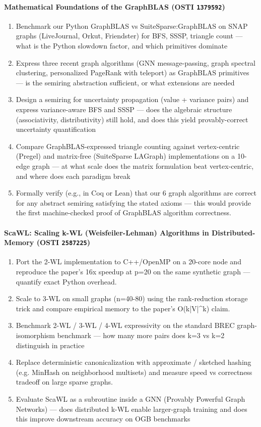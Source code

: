 \documentclass[11pt]{article}
\begin{document}
\paragraph{Mathematical Foundations of the GraphBLAS \textnormal{\small(OSTI \texttt{1379592})}}
\begin{enumerate}[leftmargin=1.6em,itemsep=0.2em,topsep=0.2em,label=Q\arabic*.]
\item Benchmark our Python GraphBLAS vs SuiteSparse:GraphBLAS on SNAP graphs (LiveJournal, Orkut, Friendster) for BFS, SSSP, triangle count --- what is the Python slowdown factor, and which primitives dominate
\item Express three recent graph algorithms (GNN message-passing, graph spectral clustering, personalized PageRank with teleport) as GraphBLAS primitives --- is the semiring abstraction sufficient, or what extensions are needed
\item Design a semiring for uncertainty propagation (value + variance pairs) and express variance-aware BFS and SSSP --- does the algebraic structure (associativity, distributivity) still hold, and does this yield provably-correct uncertainty quantification
\item Compare GraphBLAS-expressed triangle counting against vertex-centric (Pregel) and matrix-free (SuiteSparse LAGraph) implementations on a 10-edge graph --- at what scale does the matrix formulation beat vertex-centric, and where does each paradigm break
\item Formally verify (e.g., in Coq or Lean) that our 6 graph algorithms are correct for any abstract semiring satisfying the stated axioms --- this would provide the first machine-checked proof of GraphBLAS algorithm correctness.
\end{enumerate}
\paragraph{ScaWL: Scaling k-WL (Weisfeiler-Lehman) Algorithms in Distributed-Memory \textnormal{\small(OSTI \texttt{2587225})}}
\begin{enumerate}[leftmargin=1.6em,itemsep=0.2em,topsep=0.2em,label=Q\arabic*.]
\item Port the 2-WL implementation to C++/OpenMP on a 20-core node and reproduce the paper's 16x speedup at p=20 on the same synthetic graph --- quantify exact Python overhead.
\item Scale to 3-WL on small graphs (n=40-80) using the rank-reduction storage trick and compare empirical memory to the paper's O(k|V|\textasciicircum{}k) claim.
\item Benchmark 2-WL / 3-WL / 4-WL expressivity on the standard BREC graph-isomorphism benchmark --- how many more pairs does k=3 vs k=2 distinguish in practice
\item Replace deterministic canonicalization with approximate / sketched hashing (e.g. MinHash on neighborhood multisets) and measure speed vs correctness tradeoff on large sparse graphs.
\item Evaluate ScaWL as a subroutine inside a GNN (Provably Powerful Graph Networks) --- does distributed k-WL enable larger-graph training and does this improve downstream accuracy on OGB benchmarks
\end{enumerate}
\end{document}
